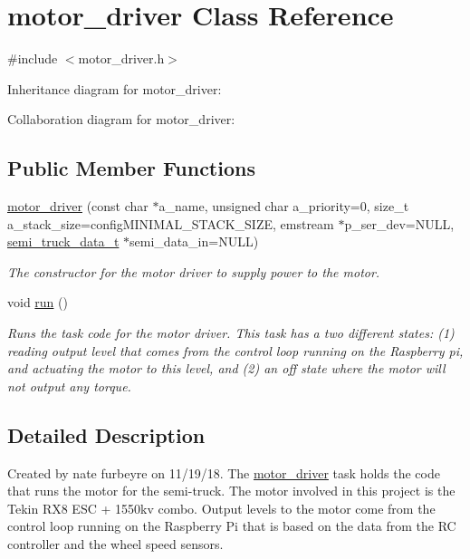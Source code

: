 \hypertarget{classmotor__driver}{}\section{motor\+\_\+driver Class Reference}
\label{classmotor__driver}


{\ttfamily \#include $<$motor\+\_\+driver.\+h$>$}



Inheritance diagram for motor\+\_\+driver\+:


Collaboration diagram for motor\+\_\+driver\+:
\subsection*{Public Member Functions}
\begin{DoxyCompactItemize}
\item 
\hyperlink{classmotor__driver_ab522a2a5ed26e326e9378a6de3395c16}{motor\+\_\+driver} (const char $\ast$a\+\_\+name, unsigned char a\+\_\+priority=0, size\+\_\+t a\+\_\+stack\+\_\+size=config\+M\+I\+N\+I\+M\+A\+L\+\_\+\+S\+T\+A\+C\+K\+\_\+\+S\+I\+ZE, emstream $\ast$p\+\_\+ser\+\_\+dev=N\+U\+LL, \hyperlink{structsemi__truck__data__t}{semi\+\_\+truck\+\_\+data\+\_\+t} $\ast$semi\+\_\+data\+\_\+in=N\+U\+LL)
\begin{DoxyCompactList}\small\item\em The constructor for the motor driver to supply power to the motor. \end{DoxyCompactList}\item 
void \hyperlink{classmotor__driver_aa6f3046dae091ef74e5b551af6b00bf3}{run} ()\hypertarget{classmotor__driver_aa6f3046dae091ef74e5b551af6b00bf3}{}\label{classmotor__driver_aa6f3046dae091ef74e5b551af6b00bf3}

\begin{DoxyCompactList}\small\item\em Runs the task code for the motor driver. This task has a two different states\+: (1) reading output level that comes from the control loop running on the Raspberry pi, and actuating the motor to this level, and (2) an off state where the motor will not output any torque. \end{DoxyCompactList}\end{DoxyCompactItemize}


\subsection{Detailed Description}
Created by nate furbeyre on 11/19/18. The \hyperlink{classmotor__driver}{motor\+\_\+driver} task holds the code that runs the motor for the semi-\/truck. The motor involved in this project is the Tekin R\+X8 E\+SC + 1550kv combo. Output levels to the motor come from the control loop running on the Raspberry Pi that is based on the data from the RC controller and the wheel speed sensors. 

